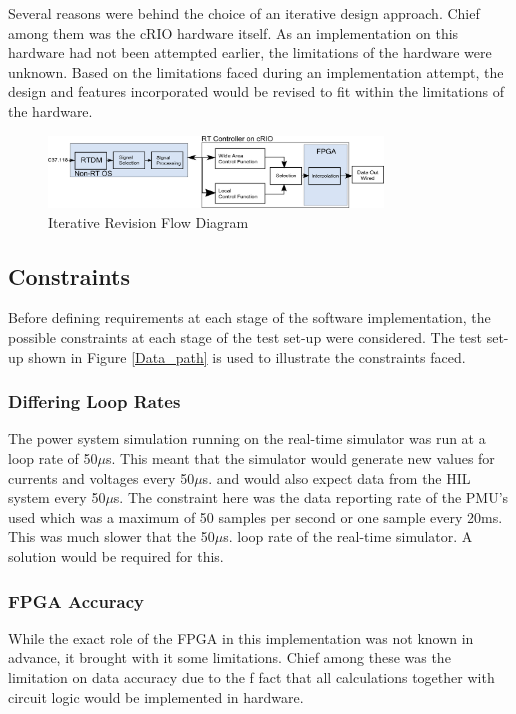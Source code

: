 \documentclass[conference]{IEEEtran}
\begin{document}
Several reasons were behind the choice of an iterative design approach. Chief among them was the cRIO hardware itself. As an implementation on this hardware had not been attempted earlier, the limitations of the hardware were unknown. Based on the limitations faced during an implementation attempt, the design and features incorporated would be revised to fit within the limitations of the hardware. \\

\begin{figure}[!t]
\centering
\includegraphics[width=3.5in]{Revision.png} 
\caption{Iterative Revision Flow Diagram}
\label{Revision1}
\end{figure}

\subsection{Constraints}

Before defining requirements at each stage of the software implementation, the possible constraints at each stage of the test set-up were considered. The test set-up shown in Figure \ref{Data_path} is used to illustrate the constraints faced.

\subsubsection*{Differing Loop Rates}
The power system simulation running on the real-time simulator was run at a loop rate of 50$\mu$s. This meant that the simulator would generate new values for currents and voltages every 50$\mu$s. and would also expect data from the HIL system every 50$\mu$s. The constraint here was the data reporting rate of the PMU's used which was a maximum of 50 samples per second or one sample every 20ms. This was much slower that the 50$\mu$s. loop rate of the real-time simulator. A solution would be required for this.

\subsubsection*{FPGA Accuracy}
While the exact role of the FPGA in this implementation was not known in advance, it brought with it some limitations. Chief among these was the limitation on data accuracy due to the f fact that all calculations together with circuit logic would be implemented in hardware.
\end{document}

